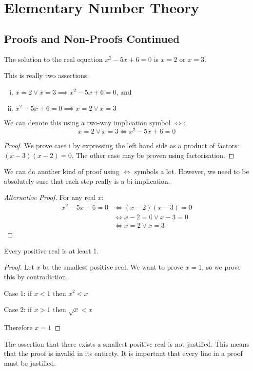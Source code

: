 \documentclass{article}
\begin{document}
	\section{Elementary Number Theory}
	\subsection{Proofs and Non-Proofs Continued}
	\begin{claim}
		The solution to the real equation $x^2-5x+6=0$ is $x=2$ or $x=3$.
	\end{claim}
	\begin{note}
		This is really two assertions:
		\begin{enumerate}[i.]
			\item $x=2 \lor x=3 \implies x^2 - 5x + 6 = 0$, and
			\item $x^2 - 5x + 6 = 0 \implies x=2 \lor x=3$
		\end{enumerate}
		We can denote this using a two-way implication symbol $\iff$:
		\[ x=2 \lor x=3 \iff x^2 - 5x + 6 = 0 \]
	\end{note}
	\begin{proof}
		We prove case i by expressing the left hand side as a product of factors: $(x-3)(x-2)=0$. The other case may be proven using factorisation.
	\end{proof}

	We can do another kind of proof using $\iff$ symbols a lot. However, we need to be absolutely sure that each step really is a bi-implication.
	\begin{proof}[Alternative Proof]
		For any real $x$:
		\begin{align*}
			x^2-5x+6=0 &\iff (x-2)(x-3) = 0 \\
			&\iff x-2 = 0 \lor x-3 = 0 \\
			&\iff x=2 \lor x = 3
		\end{align*}
	\end{proof}

	\begin{claim}
		Every positive real is at least 1.
	\end{claim}
	\begin{proof}
		Let $x$ be the smallest positive real. We want to prove $x=1$, so we prove this by contradiction.

		Case 1: if $x < 1$ then $x^2 < x$ \contradiction

		Case 2: if $x > 1$ then $\sqrt{x} < x$ \contradiction
		
		Therefore $x=1$
	\end{proof}
	\begin{note}
		The assertion that there exists a smallest positive real is not justified. This means that the proof is invalid in its entirety. It is important that every line in a proof must be justified.
	\end{note}
\end{document}
